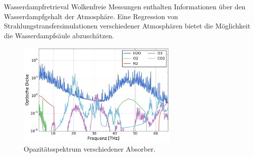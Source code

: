\documentclass{beamer}
\begin{document}
\begin{frame}{Wasserdampfretrieval}
Wolkenfreie Messungen enthalten Informationen über den Wasserdampfgehalt der Atmosphäre. Eine Regression von Strahlungstransfersimulationen verschiedener Atmosphären bietet die Möglichkeit die Wasserdampfsäule abzuschätzen.

\begin{figure}[ht]
	\centering
	\includegraphics[width=0.7\textwidth]{figures/midlatitude-summer_opacity.pdf}
	\caption{Opazitätsspektrum verschiedener Absorber.}
	\label{fig:opacity}
\end{figure}
\end{frame}
\end{document}
